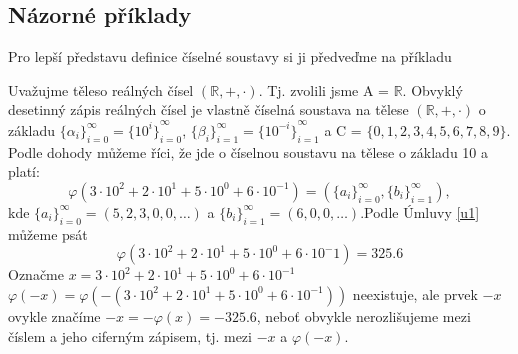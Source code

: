 \documentclass[czech,bachelor,dept470,male]{diploma}
\newcommand{\poslbeta}{\{\beta_i\}_{i=1}^{\infty}}
\newcommand{\poslalpha}{\{\alpha_i\}_{i=0}^{\infty}}
\newcommand{\posla}{\{a_i\}_{i=0}^{\infty}}
\newcommand{\poslb}{\{b_i\}_{i=1}^{\infty}}
\begin{document}
\newpage
\subsection{Názorné příklady}
Pro lepší představu definice číselné soustavy si ji předveďme na příkladu
\begin{example}
	Uvažujme těleso reálných čísel $(\mathbb{R},+,\cdot)$. Tj. zvolili jsme A = $\mathbb{R}$. Obvyklý desetinný zápis reálných čísel je vlastně číselná soustava na tělese $(\mathbb{R},+,\cdot)$ o základu $\poslalpha=\{{10^i\}}_{i=0}^{\infty}$, $\poslbeta=\{{10^{-i}\}}_{i=1}^{\infty}$ a C = $\{0,1,2,3,4,5,6,7,8,9\}$. Podle dohody můžeme říci, že jde o číselnou soustavu na tělese o základu 10 a platí:
	$$\varphi(3\cdot10^2+2\cdot10^1+5\cdot10^0+6\cdot10^{-1})=(\posla,\poslb),$$kde
	$\posla=(5,2,3,0,0,\dots)$ a $\poslb = (6,0,0,\dots)$.\newline Podle Úmluvy \ref{u1} můžeme psát $$\varphi(3\cdot10^2+2\cdot10^1+5\cdot10^0+6\cdot10^-1)=325.6$$
	Označme $x=3\cdot10^2+2\cdot10^1+5\cdot10^0+6\cdot10^{-1}$\newline
	$\varphi(-x) = \varphi(-(3\cdot10^2+2\cdot10^1+5\cdot10^0+6\cdot10^{-1}))$ neexistuje, ale prvek $-x$ ovykle značíme $-x=-\varphi(x)=-325.6$, neboť obvykle nerozlišujeme mezi číslem a jeho ciferným zápisem, tj. mezi $-x$ a $\varphi(-x)$.
	
	
\end{example}
\end{document}
